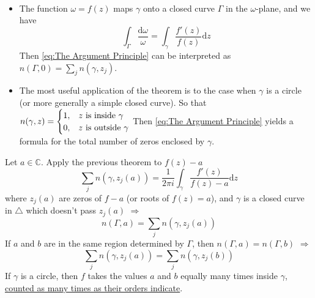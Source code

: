 \begin{remark}
    \, 
    \begin{itemize}
        \item The function  $ \omega=f(z) $ maps  $ \gamma $ onto a closed curve  $ \Gamma $ in the  $ \omega $-plane, and we have 
        \begin{equation}
            \int_\Gamma\frac{\mathrm{d}\omega}{\omega}=\int_\gamma\frac{f'(z)}{f(z)}\mathrm{d}z
        \end{equation}    
        Then \eqref{eq:The Argument Principle} can be interpreted as  $ n(\Gamma,0)=\sum\limits_jn(\gamma,z_j) $.
        \item The most useful application of the theorem is to the case when  $ \gamma $ is a circle (or more generally a simple closed curve). So that \\ $\displaystyle n(\gamma,z)=\begin{cases}
            1,&z\text{ is inside }\gamma \\
            0,&z\text{ is outside }\gamma
        \end{cases} $   
        Then \eqref{eq:The Argument Principle} yields a formula for the total number of zeros enclosed by  $ \gamma $. 
    \end{itemize}
\end{remark}
Let  $ a\in \mathbb{C} $. Apply the previous theorem to  $ f(z)-a $
\[\sum_jn(\gamma,z_j(a))=\frac{1}{2\pi i}\int_\gamma\frac{f'(z)}{f(z)-a}\mathrm{d}z\]
where  $ z_j(a) $ are zeros of  $ f-a $ (or roots of  $ f(z)=a $), and  $ \gamma $ is a closed curve in  $ \triangle $ which doesn't pass  $ z_j(a) $  $ \Rightarrow $
\[n(\Gamma,a)=\sum_jn(\gamma,z_j(a))\]
If  $ a $ and  $ b $ are in the same region determined by  $ \Gamma $, then  $ n(\Gamma,a)=n(\Gamma,b) $ $ \Rightarrow $
\begin{equation}
    \sum_jn(\gamma,z_j(a))=\sum_jn(\gamma,z_j(b))
\end{equation}      
If  $ \gamma $ is a circle, then  $ f $ takes the values  $ a $ and  $ b $ equally many times inside  $ \gamma $, \underline{counted as many times as their orders indicate}.